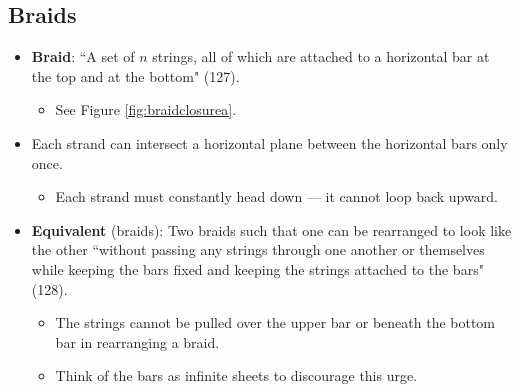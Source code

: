 \documentclass[titlepage]{article}
\numberwithin{figure}{section}
\numberwithin{table}{section}
\numberwithin{equation}{section}
\newcommand{\dq}[2]{``#1" (#2).}
\begin{document}
\subsection{Braids}
\begin{itemize}
    \item \textbf{Braid}: \dq{A set of $n$ strings, all of which are attached to a horizontal bar at the top and at the bottom}{127}
    \begin{itemize}
        \item See Figure \ref{fig:braidclosurea}.
    \end{itemize}
    \item Each strand can intersect a horizontal plane between the horizontal bars only once.
    \begin{itemize}
        \item Each strand must constantly head down --- it cannot loop back upward.
    \end{itemize}
    \item \textbf{Equivalent} (braids): Two braids such that one can be rearranged to look like the other \dq{without passing any strings through one another or themselves while keeping the bars fixed and keeping the strings attached to the bars}{128}
    \begin{itemize}
        \item The strings cannot be pulled over the upper bar or beneath the bottom bar in rearranging a braid.
        \item Think of the bars as infinite sheets to discourage this urge.
    \end{itemize}
    \begin{figure}[h!]
        \centering
        \begin{subfigure}[b]{0.3\linewidth}
            \centering
\end{subfigure}
\end{figure}
\end{itemize}
\end{document}

